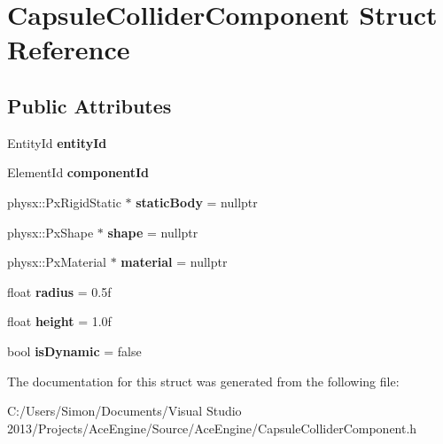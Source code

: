\hypertarget{struct_capsule_collider_component}{}\section{Capsule\+Collider\+Component Struct Reference}
\label{struct_capsule_collider_component}
\subsection*{Public Attributes}
\begin{DoxyCompactItemize}
\item 
\hypertarget{struct_capsule_collider_component_a756eb9730241eb966a9edf015ac82ed4}{}Entity\+Id {\bfseries entity\+Id}\label{struct_capsule_collider_component_a756eb9730241eb966a9edf015ac82ed4}

\item 
\hypertarget{struct_capsule_collider_component_abe06586e7c28b7de581dd86855dc3761}{}Element\+Id {\bfseries component\+Id}\label{struct_capsule_collider_component_abe06586e7c28b7de581dd86855dc3761}

\item 
\hypertarget{struct_capsule_collider_component_a18d189734f90108412ea264128a09d1d}{}physx\+::\+Px\+Rigid\+Static $\ast$ {\bfseries static\+Body} = nullptr\label{struct_capsule_collider_component_a18d189734f90108412ea264128a09d1d}

\item 
\hypertarget{struct_capsule_collider_component_a1be770ca35c7d99ef4999279da9fe082}{}physx\+::\+Px\+Shape $\ast$ {\bfseries shape} = nullptr\label{struct_capsule_collider_component_a1be770ca35c7d99ef4999279da9fe082}

\item 
\hypertarget{struct_capsule_collider_component_a552a76c9b7712d1c1032a21e6a5fbeed}{}physx\+::\+Px\+Material $\ast$ {\bfseries material} = nullptr\label{struct_capsule_collider_component_a552a76c9b7712d1c1032a21e6a5fbeed}

\item 
\hypertarget{struct_capsule_collider_component_ae89b8784348c24165911a2d199049f0e}{}float {\bfseries radius} = 0.\+5f\label{struct_capsule_collider_component_ae89b8784348c24165911a2d199049f0e}

\item 
\hypertarget{struct_capsule_collider_component_a21126952a21245d697d042c741901eca}{}float {\bfseries height} = 1.\+0f\label{struct_capsule_collider_component_a21126952a21245d697d042c741901eca}

\item 
\hypertarget{struct_capsule_collider_component_a83dfd7b15c450998654ed85b5705e45d}{}bool {\bfseries is\+Dynamic} = false\label{struct_capsule_collider_component_a83dfd7b15c450998654ed85b5705e45d}

\end{DoxyCompactItemize}


The documentation for this struct was generated from the following file\+:\begin{DoxyCompactItemize}
\item 
C\+:/\+Users/\+Simon/\+Documents/\+Visual Studio 2013/\+Projects/\+Ace\+Engine/\+Source/\+Ace\+Engine/Capsule\+Collider\+Component.\+h\end{DoxyCompactItemize}
